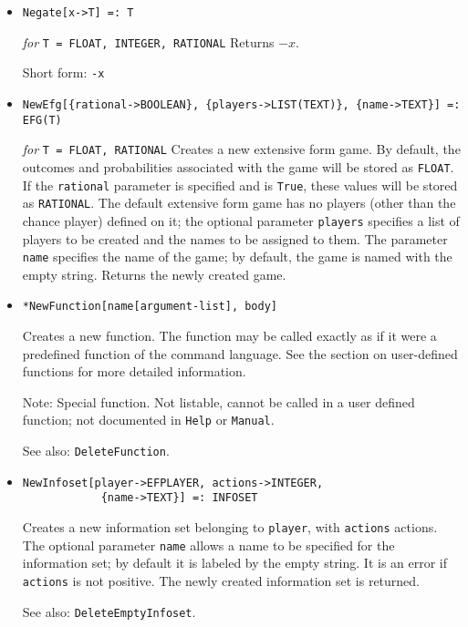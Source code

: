 \begin{itemize}
\item 
\protect \large \begin{verbatim}
Negate[x->T] =: T
\end{verbatim} \normalsize

{\it for} {\tt T = FLOAT, INTEGER, RATIONAL}
\bd
Returns $-x$.
\item
[Short form:] \verb+-x+
\ed

\item
\protect \large \begin{verbatim} 
NewEfg[{rational->BOOLEAN}, {players->LIST(TEXT)}, {name->TEXT}] =: EFG(T)
\end{verbatim}\normalsize

{\it for} {\tt T = FLOAT, RATIONAL}
\bd
Creates a new extensive form game.  By default, the
outcomes and probabilities associated with the game will be stored as
{\tt FLOAT}.  If the \verb+rational+ parameter is specified and is \verb+True+,
these values will be stored as {\tt RATIONAL}.  The default extensive form
game has no players (other than the chance player) defined on it; the
optional parameter \verb+players+ specifies a list of players to be
created and the names to be assigned to them.  The parameter \verb+name+
specifies the name of the game; by default, the game is named
with the empty string.  Returns the newly created game.
\ed

\item   
\protect \large \begin{verbatim}
*NewFunction[name[argument-list], body]
\end{verbatim}\normalsize

\bd
Creates a new function.  The function may be called exactly
as if it were a predefined function of the command language.  See the
section on user-defined functions for more detailed information.
\item [Note:]  Special function.  Not listable, cannot be called in a
user defined function; not documented in \verb+Help+ or \verb+Manual+.  
\item [See also:] \verb+DeleteFunction+.
\ed

\item
\protect \large \begin{verbatim} 
NewInfoset[player->EFPLAYER, actions->INTEGER,
            {name->TEXT}] =: INFOSET
\end{verbatim}\normalsize

\bd
Creates a new information set belonging to \verb+player+, with
\verb+actions+ actions.  The optional
parameter \verb+name+ allows a name to be specified for the information
set; by default it is labeled by the empty string.  It is an error if
\verb+actions+ is not positive.  The newly created
information set is returned.
\item [See also:] \verb+DeleteEmptyInfoset+.
\ed


\end{itemize}
